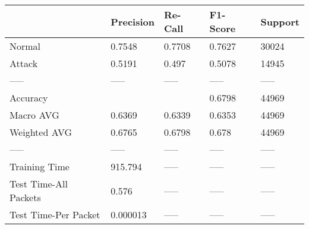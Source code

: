 \begin{tabular}{lllll}
\toprule
{} & Precision & Re-Call & F1-Score & Support \\
\midrule
Normal                &    0.7548 &  0.7708 &   0.7627 &   30024 \\
Attack                &    0.5191 &   0.497 &   0.5078 &   14945 \\
-----                 &     ----- &   ----- &    ----- &   ----- \\
Accuracy              &           &         &   0.6798 &   44969 \\
Macro AVG             &    0.6369 &  0.6339 &   0.6353 &   44969 \\
Weighted AVG          &    0.6765 &  0.6798 &    0.678 &   44969 \\
-----                 &     ----- &   ----- &    ----- &   ----- \\
Training Time         &   915.794 &   ----- &    ----- &   ----- \\
Test Time-All Packets &     0.576 &   ----- &    ----- &   ----- \\
Test Time-Per Packet  &  0.000013 &   ----- &    ----- &   ----- \\
\bottomrule
\end{tabular}

